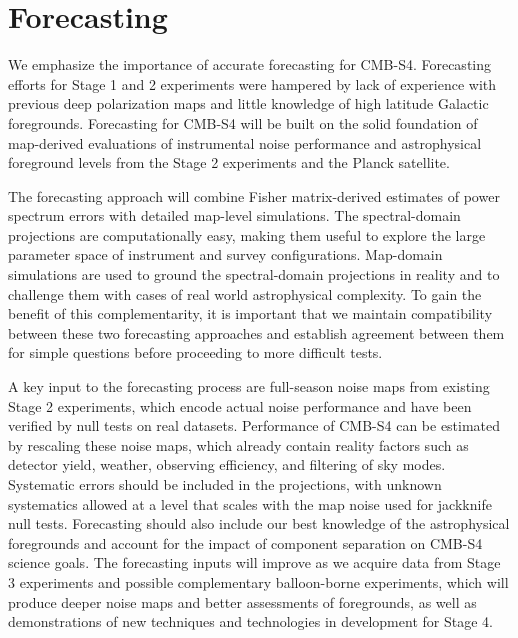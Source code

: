 
\section{Forecasting}

We emphasize the importance of accurate forecasting for CMB-S4.
Forecasting efforts for Stage 1 and 2 experiments were hampered by lack of experience with previous deep polarization maps and little knowledge of high latitude Galactic foregrounds.
Forecasting for CMB-S4 will be built on the solid foundation of map-derived evaluations of instrumental noise performance and astrophysical foreground levels from the Stage 2 experiments and the Planck satellite.

The forecasting approach will combine Fisher matrix-derived estimates of power spectrum errors with detailed map-level simulations.
The spectral-domain projections are computationally easy, making them useful to explore the large parameter space of instrument and survey configurations.
Map-domain simulations are used to ground the spectral-domain projections in reality and to challenge them with cases of real world astrophysical complexity.
To gain the benefit of this complementarity, it is important that we maintain compatibility between these two forecasting approaches and establish agreement between them for simple questions before proceeding to more difficult tests.

A key input to the forecasting process are full-season noise maps from existing Stage 2 experiments, which encode actual noise performance and have been verified by null tests on real datasets.
Performance of CMB-S4 can be estimated by rescaling these noise maps, which already contain reality factors such as detector yield, weather, observing efficiency, and filtering of sky modes.
Systematic errors should be included in the projections, with unknown systematics allowed at a level that scales with the map noise used for jackknife null tests.
Forecasting should also include our best knowledge of the astrophysical foregrounds and account for the impact of component separation on CMB-S4 science goals.
The forecasting inputs will improve as we acquire data from Stage 3 experiments and possible complementary balloon-borne experiments, which will produce deeper noise maps and better assessments of foregrounds, as well as demonstrations of new techniques and technologies in development for Stage 4.

